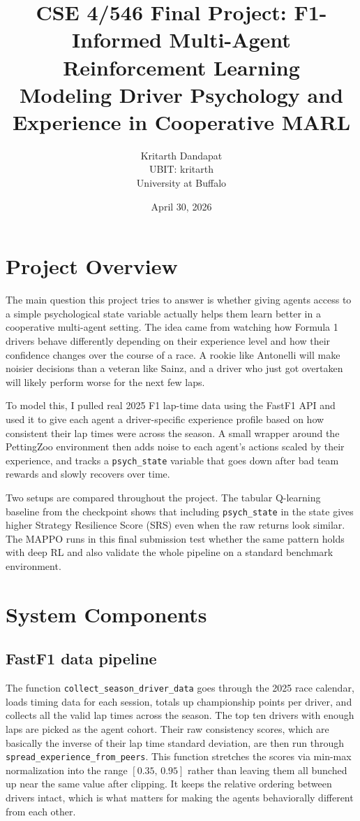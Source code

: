 \documentclass[11pt]{article}
\title{CSE 4/546 Final Project: F1-Informed Multi-Agent Reinforcement Learning \\
\large Modeling Driver Psychology and Experience in Cooperative MARL}
\author{
    Kritarth Dandapat \\
    UBIT: kritarth \\
    University at Buffalo
}
\date{April 30, 2026}
\begin{document}
\maketitle

\section{Project Overview}

The main question this project tries to answer is whether giving agents access to a
simple psychological state variable actually helps them learn better in a cooperative
multi-agent setting. The idea came from watching how Formula 1 drivers behave differently
depending on their experience level and how their confidence changes over the course of a
race. A rookie like Antonelli will make noisier decisions than a veteran like Sainz, and
a driver who just got overtaken will likely perform worse for the next few laps.

To model this, I pulled real 2025 F1 lap-time data using the FastF1 API and used it to
give each agent a driver-specific experience profile based on how consistent their lap
times were across the season. A small wrapper around the PettingZoo environment then adds
noise to each agent's actions scaled by their experience, and tracks a \texttt{psych\_state}
variable that goes down after bad team rewards and slowly recovers over time.

Two setups are compared throughout the project. The tabular Q-learning baseline from the
checkpoint shows that including \texttt{psych\_state} in the state gives higher Strategy
Resilience Score (SRS) even when the raw returns look similar. The MAPPO runs in this
final submission test whether the same pattern holds with deep RL and also validate the
whole pipeline on a standard benchmark environment.

\section{System Components}

\subsection*{FastF1 data pipeline}
The function \texttt{collect\_season\_driver\_data} goes through the 2025 race calendar,
loads timing data for each session, totals up championship points per driver, and collects
all the valid lap times across the season. The top ten drivers with enough laps are picked
as the agent cohort. Their raw consistency scores, which are basically the inverse of their
lap time standard deviation, are then run through \texttt{spread\_experience\_from\_peers}.
This function stretches the scores via min-max normalization into the range $[0.35,\, 0.95]$
rather than leaving them all bunched up near the same value after clipping. It keeps the relative ordering
between drivers intact, which is what matters for making the agents behaviorally different
from each other.
\end{document}
